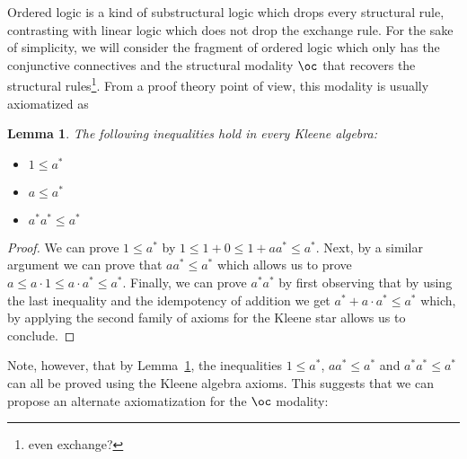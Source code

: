 \documentclass[12pt,a4paper]{article}
\numberwithin{equation}{section}
\theoremstyle{plain}
\newtheorem{lemma}[theorem]{Lemma}
\theoremstyle{definition}
\begin{document}
Ordered logic is a kind of substructural logic which drops every structural rule, contrasting with linear logic which does not drop the exchange rule. For the sake of simplicity, we will consider the fragment of ordered logic which only has the conjunctive connectives and the structural modality $\oc$ that recovers the structural rules\footnote{even exchange?}. From a proof theory point of view, this modality is usually axiomatized as
%
%
%
\begin{lemma}
  \label{lem:ineq}
  The following inequalities hold in every Kleene algebra:
  \begin{itemize}
  \item $1 \leq a^*$
  \item $a \leq a^*$
  \item $a^* a^*\leq a^*$
  \end{itemize}
\end{lemma}
\begin{proof}
  We can prove $1 \leq a^*$ by $1 \leq 1 + 0 \leq 1 + aa^* \leq a^*$. Next, by a similar argument we can prove that $aa^* \leq a^*$ which allows us to prove $a \leq a\cdot 1 \leq a\cdot a^* \leq a^*$. Finally, we can prove $a^*a^*$ by first observing that by using the last inequality and the idempotency of addition we get $a^* + a\cdot a^* \leq a^*$ which, by applying the second family of axioms for the Kleene star allows us to conclude.
\end{proof}
Note, however, that by Lemma~\ref{lem:ineq}, the inequalities $1 \leq a^*$, $aa^* \leq a^*$ and $a^*a^* \leq a^*$ can all
be proved using the Kleene algebra axioms. This suggests that we can propose an alternate
axiomatization for the $\oc$ modality:

\end{document}
